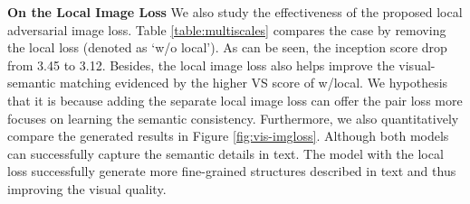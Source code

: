 \documentclass[10pt,twocolumn,letterpaper]{article}
\begin{document}

\textbf{On the Local Image Loss} We also study the effectiveness of the proposed local adversarial image loss. 
Table \ref{table:multiscales} compares the case by removing the local loss (denoted as `w/o local').
As can be seen, the inception score drop from 3.45 to 3.12.
Besides, the local image loss also helps improve the visual-semantic matching evidenced by the higher VS score of w/local. We hypothesis that it is because adding the separate local image loss can offer the pair loss more focuses on learning the semantic consistency. 
Furthermore, we also quantitatively compare the generated results in Figure \ref{fig:vis-imgloss}. Although both models can successfully capture the semantic details in text. The model with the local loss successfully generate more fine-grained structures described in text and thus improving the visual quality. 




%			
\end{document}
